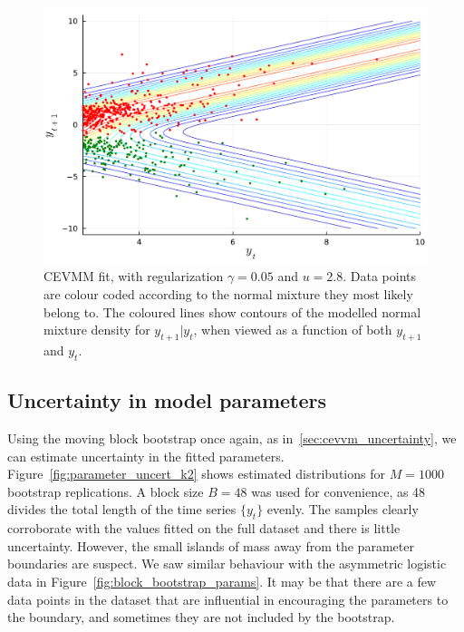 \documentclass[11pt,twoside,openany]{book}
\numberwithin{Theorem}{chapter}
\numberwithin{Definition}{chapter}
\numberwithin{Lemma}{chapter}
\numberwithin{Algorithm}{chapter}
\numberwithin{equation}{chapter}
\begin{document}
\begin{figure}[htp]
  \centering
  \includegraphics[scale=0.75]{../elexon/figures/imbalance_contour_with_reg05.pdf}
  \caption{CEVMM fit, with regularization $\gamma=0.05$ and $u=2.8$. Data points are colour coded according to the normal mixture they most likely belong to. The coloured
    lines show contours of the modelled normal mixture density
    for $y_{t+1}|y_{t}$, when viewed as a function of both $y_{t+1}$ and $y_{t}$.}\label{fig:imb_contour_with_reg05}
\end{figure}

\subsection{Uncertainty in model parameters}

Using the moving block bootstrap once again, as in~\ref{sec:cevvm_uncertainty}, we can
estimate uncertainty in the fitted parameters. Figure~\ref{fig:parameter_uncert_k2}
shows estimated distributions for $M=1000$ bootstrap replications.
A block size $B=48$ was used for convenience, as 48 divides the total length of the
time series $\{y_t\}$ evenly.
The samples clearly corroborate with the values fitted on the full dataset and
there is little uncertainty. However,
the small islands of mass away from the parameter boundaries are suspect.
We saw similar behaviour with the asymmetric logistic data in
Figure~\ref{fig:block_bootstrap_params}. It may be that there are
a few data points in the dataset that are influential in encouraging
the parameters to the boundary, and sometimes they are not included by the bootstrap.
\end{document}
